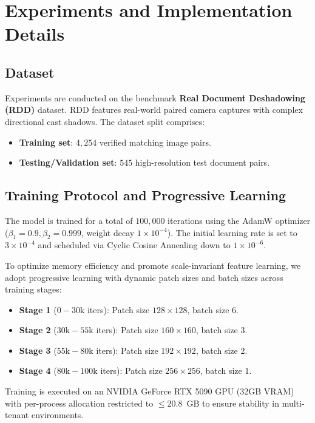 \documentclass[conference]{IEEEtran}
\begin{document}
\section{Experiments and Implementation Details}

\subsection{Dataset}
Experiments are conducted on the benchmark \textbf{Real Document Deshadowing (RDD)} dataset. RDD features real-world paired camera captures with complex directional cast shadows. The dataset split comprises:
\begin{itemize}
    \item \textbf{Training set}: $4,254$ verified matching image pairs.
    \item \textbf{Testing/Validation set}: $545$ high-resolution test document pairs.
\end{itemize}

\subsection{Training Protocol and Progressive Learning}
The model is trained for a total of $100,000$ iterations using the AdamW optimizer ($\beta_1=0.9, \beta_2=0.999$, weight decay $1\times 10^{-4}$). The initial learning rate is set to $3\times 10^{-4}$ and scheduled via Cyclic Cosine Annealing down to $1\times 10^{-6}$.

To optimize memory efficiency and promote scale-invariant feature learning, we adopt progressive learning with dynamic patch sizes and batch sizes across training stages:
\begin{itemize}
    \item \textbf{Stage 1} ($0 - 30\text{k}$ iters): Patch size $128 \times 128$, batch size 6.
    \item \textbf{Stage 2} ($30\text{k} - 55\text{k}$ iters): Patch size $160 \times 160$, batch size 3.
    \item \textbf{Stage 3} ($55\text{k} - 80\text{k}$ iters): Patch size $192 \times 192$, batch size 2.
    \item \textbf{Stage 4} ($80\text{k} - 100\text{k}$ iters): Patch size $256 \times 256$, batch size 1.
\end{itemize}
Training is executed on an NVIDIA GeForce RTX 5090 GPU (32GB VRAM) with per-process allocation restricted to $\le 20.8$~GB to ensure stability in multi-tenant environments.
\end{document}
